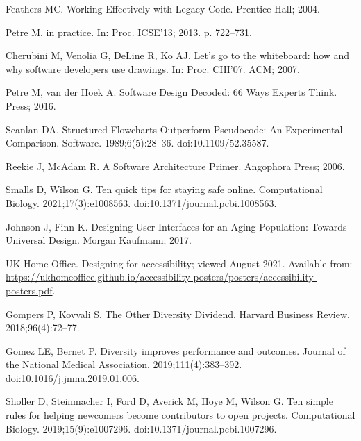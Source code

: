 \documentclass[10pt,letterpaper]{article}
\begin{document}
\begin{thebibliography}{10}
Feathers MC.
\newblock Working Effectively with Legacy Code.
\newblock Prentice-Hall; 2004.

Petre M.
 in practice.
\newblock In: Proc. {ICSE'13}; 2013. p. 722--731.

Cherubini M, Venolia G, DeLine R, Ko AJ.
\newblock Let's go to the whiteboard: how and why software developers use
  drawings.
\newblock In: Proc. {CHI'07}. {ACM}; 2007.

Petre M, {van der Hoek} A.
\newblock Software Design Decoded: 66 Ways Experts Think.
 Press; 2016.

Scanlan DA.
\newblock Structured Flowcharts Outperform Pseudocode: An Experimental
  Comparison.
 Software. 1989;6(5):28--36.
\newblock doi:{10.1109/52.35587}.

Reekie J, {McAdam} R.
\newblock A Software Architecture Primer.
\newblock Angophora Press; 2006.

Smalls D, Wilson G.
\newblock Ten quick tips for staying safe online.
 Computational Biology. 2021;17(3):e1008563.
\newblock doi:{10.1371/journal.pcbi.1008563}.

Johnson J, Finn K.
\newblock Designing User Interfaces for an Aging Population: Towards Universal
  Design.
\newblock Morgan Kaufmann; 2017.

{UK Home Office}. Designing for accessibility; viewed August 2021.
\newblock Available from:
  \url{https://ukhomeoffice.github.io/accessibility-posters/posters/accessibility-posters.pdf}.

Gompers P, Kovvali S.
\newblock The Other Diversity Dividend.
\newblock Harvard Business Review. 2018;96(4):72--77.

Gomez LE, Bernet P.
\newblock Diversity improves performance and outcomes.
\newblock Journal of the National Medical Association. 2019;111(4):383--392.
\newblock doi:{10.1016/j.jnma.2019.01.006}.

Sholler D, Steinmacher I, Ford D, Averick M, Hoye M, Wilson G.
\newblock Ten simple rules for helping newcomers become contributors to open
  projects.
 Computational Biology. 2019;15(9):e1007296.
\newblock doi:{10.1371/journal.pcbi.1007296}.

\end{thebibliography}
\end{document}
